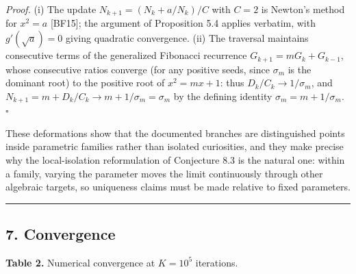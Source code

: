\documentclass[
  11pt,
  letterpaper,
]{article}
\begin{document}
\emph{Proof.} (i) The update \(N_{k+1} = (N_k + a/N_k)/C\) with
\(C = 2\) is Newton's method for \(x^2 = a\) {[}BF15{]}; the argument of
Proposition 5.4 applies verbatim, with \(g'(\sqrt{a}) = 0\) giving
quadratic convergence. (ii) The traversal maintains consecutive terms of
the generalized Fibonacci recurrence \(G_{k+1} = m G_k + G_{k-1}\),
whose consecutive ratios converge (for any positive seeds, since
\(\sigma_m\) is the dominant root) to the positive root of
\(x^2 = mx + 1\): thus \(D_k / C_k \to 1/\sigma_m\), and
\(N_{k+1} = m + D_k/C_k \to m + 1/\sigma_m = \sigma_m\) by the defining
identity \(\sigma_m = m + 1/\sigma_m\). \(\square\)

These deformations show that the documented branches are distinguished
points inside parametric families rather than isolated curiosities, and
they make precise why the local-isolation reformulation of Conjecture
8.3 is the natural one: within a family, varying the parameter moves the
limit continuously through other algebraic targets, so uniqueness claims
must be made relative to fixed parameters.

\begin{center}\rule{0.5\linewidth}{0.5pt}\end{center}

\subsection{7. Convergence}\label{convergence}

\textbf{Table 2.} Numerical convergence at \(K = 10^5\) iterations.
\end{document}
